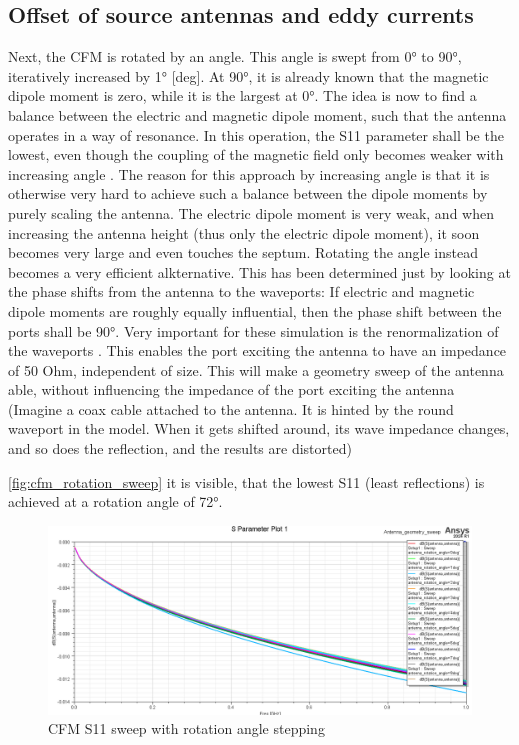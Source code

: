

\subsection{Offset of source antennas and eddy currents}

Next, the CFM is rotated by an angle. This angle is swept from 0° to 90°, iteratively increased by 1° [deg]. At 90°, it is already known that the magnetic dipole moment is zero, while it is the largest at 0°. The idea is now to find a balance between the electric and magnetic dipole moment, such that the antenna operates in a way of resonance. In this operation, the S11 parameter shall be the lowest, even though the coupling of the magnetic field only becomes weaker with increasing angle . The reason for this approach by increasing angle is that it is otherwise very hard to achieve such a balance between the dipole moments by purely scaling the antenna. The electric dipole moment is very weak, and when increasing the antenna height (thus only the electric dipole moment), it soon becomes very large and even touches the septum. Rotating the angle instead becomes a very efficient alkternative. This has been determined just by looking at the phase shifts from the antenna to the waveports: If electric and magnetic dipole moments are roughly equally influential, then the phase shift between the ports shall be 90°. Very important for these simulation is the renormalization of the waveports . This enables the port exciting the antenna to have an impedance of 50 Ohm, independent of size. This will make a geometry sweep of the antenna able, without influencing the impedance of the port exciting the antenna (Imagine a coax cable attached to the antenna. It is hinted by the round waveport in the model. When it gets shifted around, its wave impedance changes, and so does the reflection, and the results are distorted) 

\autoref{fig:cfm_rotation_sweep} it is visible, that the lowest S11 (least reflections) is achieved at a rotation angle of 72°. 

\begin{figure}[h]
    \centering
    \includegraphics[width=1\linewidth]{content//30_simulations//img/cfm_rotation_sweep.png}
    \caption{CFM S11 sweep with rotation angle stepping}
    \label{fig:cfm_rotation_sweep}
\end{figure}


